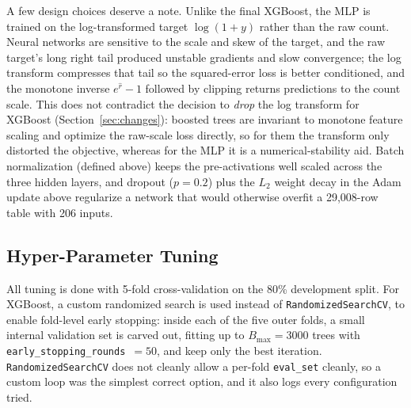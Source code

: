 \documentclass[journal]{IEEEtran}
\begin{document}
A few design choices deserve a note. Unlike the final XGBoost, the MLP is
trained on the log-transformed target $\log(1+y)$ rather than the raw count.
Neural networks are sensitive to the scale and skew of the target, and the raw
target's long right tail produced unstable gradients and slow convergence; the
log transform compresses that tail so the squared-error loss is better
conditioned, and the monotone inverse $e^{\hat r}-1$ followed by clipping returns
predictions to the count scale. This does not contradict the decision to
\emph{drop} the log transform for XGBoost (Section~\ref{sec:changes}): boosted
trees are invariant to monotone feature scaling and optimize the raw-scale loss
directly, so for them the transform only distorted the objective, whereas for the
MLP it is a numerical-stability aid. Batch normalization
(defined above) keeps the pre-activations well scaled across the three hidden
layers, and dropout ($p=0.2$) plus the $L_2$ weight decay in the Adam update
above regularize a network that would otherwise overfit a 29{,}008-row table with 206
inputs.

\subsection{Hyper-Parameter Tuning}
\label{sec:tuning}
All tuning is done with 5-fold cross-validation on the 80\% development split.
For XGBoost, a custom randomized search is used instead of
\texttt{RandomizedSearchCV}, to enable fold-level early stopping: inside
each of the five outer folds, a small internal validation set is carved out, fitting
up to $B_{\max}=3000$ trees with \texttt{early\_stopping\_rounds}~$=50$, and keep
only the best iteration. \texttt{RandomizedSearchCV} does not cleanly allow a
per-fold \texttt{eval\_set} cleanly, so a custom loop was the simplest correct
option, and it also logs every configuration tried.
\end{document}

